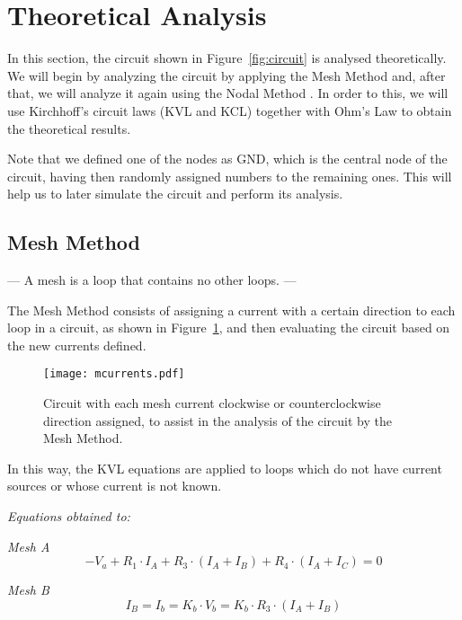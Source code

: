 \section{Theoretical Analysis}
\label{sec:analysis}

In this section, the circuit shown in Figure~\ref{fig:circuit} is analysed
theoretically. We will begin by analyzing the circuit by applying the Mesh Method and, after that, we will analyze it again using the Nodal Method . In order to this, we will use Kirchhoff's circuit laws (KVL and KCL) together with Ohm's Law to obtain the theoretical results.

Note that we defined one of the nodes as GND, which is the central node of the circuit, 
having then randomly assigned numbers to the remaining ones. This will help us to
later simulate the circuit and perform its analysis.

 
\subsection{Mesh Method}

--- A mesh is a loop that contains no other loops. ---

The Mesh Method consists of assigning a current with a certain direction to each loop in a circuit, as shown in Figure~\ref{fig:mcurrents}, and then evaluating the circuit based on the new currents defined.

\begin{figure}[h!] \centering
\texttt{[image: mcurrents.pdf]}
\caption{Circuit with each mesh current clockwise or counterclockwise direction assigned, to assist in the analysis of the circuit by the Mesh Method.}
\label{fig:mcurrents}
\end{figure}

In this way, the KVL equations are applied to loops which do not have current sources or whose current is not known.

\textit{Equations obtained to:}

\textit{Mesh A}
\begin{equation}
  -V_a+ R_1\cdot I_A + R_3 \cdot (I_A+I_B)+ R_4 \cdot (I_A+I_C) =0
  \label{eq:kvl}
\end{equation}

\textit{Mesh B}
\begin{equation}
  I_B = I_b = K_b \cdot V_b = K_b \cdot R_3 \cdot (I_A + I_B)
  \label{eq:kvl2}
\end{equation}

